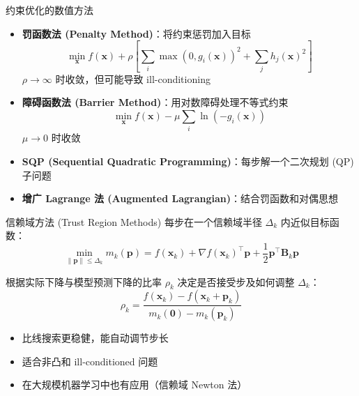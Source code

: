 \documentclass[11pt, aspectratio=169, svgnames, table, fontset=fandol]{ctexbeamer}
\begin{document}
\begin{frame}{约束优化的数值方法}
  \begin{itemize}
    \item \textbf{罚函数法 (Penalty Method)}：将约束惩罚加入目标
      \begin{equation*}
        \min_{\bm{x}} f(\bm{x}) + \rho \left[\sum_i \max(0, g_i(\bm{x}))^2 + \sum_j h_j(\bm{x})^2\right]
      \end{equation*}
      $\rho \to \infty$ 时收敛，但可能导致 ill-conditioning

    \item \textbf{障碍函数法 (Barrier Method)}：用对数障碍处理不等式约束
      \begin{equation*}
        \min_{\bm{x}} f(\bm{x}) - \mu \sum_i \ln(-g_i(\bm{x}))
      \end{equation*}
      $\mu \to 0$ 时收敛

    \item \textbf{SQP (Sequential Quadratic Programming)}：每步解一个二次规划 (QP) 子问题
    \item \textbf{增广 Lagrange 法 (Augmented Lagrangian)}：结合罚函数和对偶思想
  \end{itemize}
\end{frame}

\begin{frame}{信赖域方法 (Trust Region Methods)}
  每步在一个信赖域半径 $\Delta_k$ 内近似目标函数：
  \begin{equation*}
    \min_{\|\bm{p}\| \leq \Delta_k} m_k(\bm{p}) = f(\bm{x}_k) + \nabla f(\bm{x}_k)^\top \bm{p} + \frac12 \bm{p}^\top \bm{B}_k \bm{p}
  \end{equation*}

  \vspace{4pt}
  根据实际下降与模型预测下降的比率 $\rho_k$ 决定是否接受步及如何调整 $\Delta_k$：
  \begin{equation*}
    \rho_k = \frac{f(\bm{x}_k) - f(\bm{x}_k + \bm{p}_k)}{m_k(\bm{0}) - m_k(\bm{p}_k)}
  \end{equation*}

  \begin{itemize}
    \item 比线搜索更稳健，能自动调节步长
    \item 适合非凸和 ill-conditioned 问题
    \item 在大规模机器学习中也有应用（信赖域 Newton 法）
  \end{itemize}
\end{frame}
\end{document}
